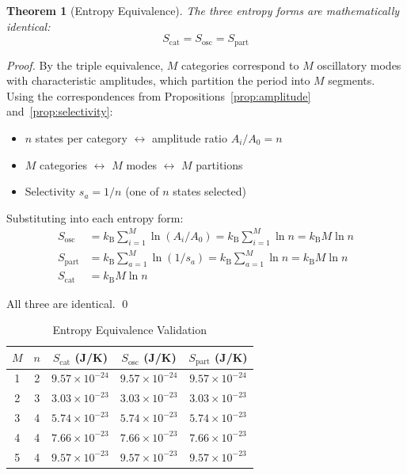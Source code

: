 \documentclass[twocolumn,10pt]{article}
\newtheorem{theorem}{Theorem}[section]
\theoremstyle{definition}
\theoremstyle{remark}
\newcommand{\kB}{k_{\mathrm{B}}}
\begin{document}
\begin{theorem}[Entropy Equivalence]
\label{thm:entropy_equiv}
The three entropy forms are mathematically identical:
\begin{equation}
S_{\text{cat}} = S_{\text{osc}} = S_{\text{part}}
\end{equation}
\end{theorem}

\begin{proof}
By the triple equivalence, $M$ categories correspond to $M$ oscillatory modes with characteristic amplitudes, which partition the period into $M$ segments. Using the correspondences from Propositions~\ref{prop:amplitude} and~\ref{prop:selectivity}:
\begin{itemize}
\item $n$ states per category $\leftrightarrow$ amplitude ratio $A_i/A_0 = n$
\item $M$ categories $\leftrightarrow$ $M$ modes $\leftrightarrow$ $M$ partitions
\item Selectivity $s_a = 1/n$ (one of $n$ states selected)
\end{itemize}

Substituting into each entropy form:
\begin{align}
S_{\text{osc}} &= \kB \sum_{i=1}^M \ln(A_i/A_0) = \kB \sum_{i=1}^M \ln n = \kB M \ln n \\
S_{\text{part}} &= \kB \sum_{a=1}^M \ln(1/s_a) = \kB \sum_{a=1}^M \ln n = \kB M \ln n \\
S_{\text{cat}} &= \kB M \ln n
\end{align}

All three are identical. \qed
\end{proof}

\begin{table}[h]
\centering
\caption{Entropy Equivalence Validation}
\label{tab:entropy_equiv}
\begin{tabular}{ccccc}
\toprule
$M$ & $n$ & $S_{\text{cat}}$ (J/K) & $S_{\text{osc}}$ (J/K) & $S_{\text{part}}$ (J/K) \\
\midrule
1 & 2 & $9.57 \times 10^{-24}$ & $9.57 \times 10^{-24}$ & $9.57 \times 10^{-24}$ \\
2 & 3 & $3.03 \times 10^{-23}$ & $3.03 \times 10^{-23}$ & $3.03 \times 10^{-23}$ \\
3 & 4 & $5.74 \times 10^{-23}$ & $5.74 \times 10^{-23}$ & $5.74 \times 10^{-23}$ \\
4 & 4 & $7.66 \times 10^{-23}$ & $7.66 \times 10^{-23}$ & $7.66 \times 10^{-23}$ \\
5 & 4 & $9.57 \times 10^{-23}$ & $9.57 \times 10^{-23}$ & $9.57 \times 10^{-23}$ \\
\bottomrule
\end{tabular}
\end{table}
\end{document}
